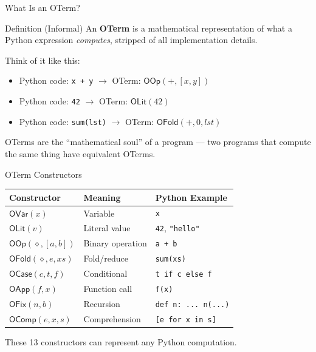 \documentclass[aspectratio=169,11pt]{beamer}
\begin{document}
\begin{frame}{What Is an OTerm?}
\begin{block}{Definition (Informal)}
An \textbf{OTerm} is a mathematical representation of what a Python
expression \emph{computes}, stripped of all implementation details.
\end{block}

\vspace{0.5em}
Think of it like this:
\begin{itemize}
\item Python code: \texttt{x + y} $\longrightarrow$ OTerm: $\mathsf{OOp}(+, [x, y])$
\item Python code: \texttt{42} $\longrightarrow$ OTerm: $\mathsf{OLit}(42)$
\item Python code: \texttt{sum(lst)} $\longrightarrow$ OTerm: $\mathsf{OFold}(+, 0, \mathit{lst})$
\end{itemize}

\vspace{0.5em}
OTerms are the ``mathematical soul'' of a program --- two programs
that compute the same thing have equivalent OTerms.
\end{frame}

\begin{frame}{OTerm Constructors}
\begin{center}
\begin{tabular}{lll}
\toprule
\textbf{Constructor} & \textbf{Meaning} & \textbf{Python Example} \\
\midrule
$\mathsf{OVar}(x)$ & Variable & \texttt{x} \\
$\mathsf{OLit}(v)$ & Literal value & \texttt{42}, \texttt{"hello"} \\
$\mathsf{OOp}(\diamond, [a,b])$ & Binary operation & \texttt{a + b} \\
$\mathsf{OFold}(\diamond, e, xs)$ & Fold/reduce & \texttt{sum(xs)} \\
$\mathsf{OCase}(c, t, f)$ & Conditional & \texttt{t if c else f} \\
$\mathsf{OApp}(f, x)$ & Function call & \texttt{f(x)} \\
$\mathsf{OFix}(n, b)$ & Recursion & \texttt{def n: ... n(...)} \\
$\mathsf{OComp}(e, x, s)$ & Comprehension & \texttt{[e for x in s]} \\
\bottomrule
\end{tabular}
\end{center}

These 13 constructors can represent any Python computation.
\end{frame}
\end{document}
